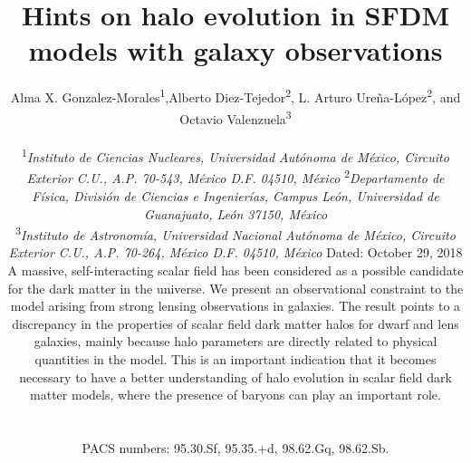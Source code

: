 \documentclass[15pt]{IEEEtran}
\begin{document}
\justifying
\title{Hints on halo evolution in SFDM models with galaxy observations\\}

\author{Alma X. Gonzalez-Morales\textsuperscript{1},Alberto Diez-Tejedor\textsuperscript{2}, L. Arturo Ureña-López\textsuperscript{2}, and Octavio Valenzuela\textsuperscript{3}\\
\begin{center}
{\small\textsuperscript{1}\textit{Instituto de Ciencias Nucleares, Universidad Autónoma de México, Circuito Exterior C.U., A.P. 70-543, México D.F. 04510, México}}
{\small\textsuperscript{2}\textit{Departamento de Física, División de Ciencias e Ingenierías, Campus León, Universidad de Guanajuato, León 37150, México}}

{\small\textsuperscript{3}\textit{Instituto de Astronomía, Universidad Nacional Autónoma de México, Circuito Exterior C.U., A.P. 70-264, México D.F. 04510, México}}
{\small{Dated: October 29, 2018}}
\end{center}


{\begin{justify}\small 
A massive, self-interacting scalar field has been considered as a possible candidate for the dark matter in the universe.  We present an observational constraint to the model arising from strong lensing observations in galaxies.  The result points to a discrepancy in the properties of scalar field dark matter halos for dwarf and lens galaxies, mainly because halo parameters are directly related to physical quantities in the model.  This is an important indication that it becomes necessary to have a better understanding of halo evolution in scalar field dark matter models, where the presence of baryons can play an important role.
 \end{justify}}
 \\[0.3cm]
{\begin{flushleft}
\small 
PACS numbers:  95.30.Sf, 95.35.+d, 98.62.Gq, 98.62.Sb.
\end{flushleft}}}
\maketitle
\end{document}
